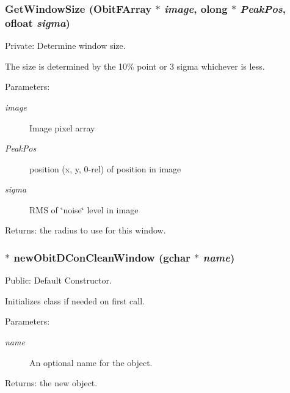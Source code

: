 \subsubsection{ Get\-Window\-Size ({\bf Obit\-FArray} $\ast$ {\em image}, {\bf olong} $\ast$ {\em Peak\-Pos}, {\bf ofloat} {\em sigma})}\label{ObitDConCleanWindow_8c_a6}


Private: Determine window size. 

The size is determined by the 10\% point or 3 sigma whichever is less. \begin{Desc}
\item[Parameters:]
\begin{description}
\item[{\em image}]Image pixel array \item[{\em Peak\-Pos}]position (x, y, 0-rel) of position in image \item[{\em sigma}]RMS of \char`\"{}noise\char`\"{} level in image \end{description}
\end{Desc}
\begin{Desc}
\item[Returns:]the radius to use for this window. \end{Desc}
\subsubsection{$\ast$ new\-Obit\-DCon\-Clean\-Window (gchar $\ast$ {\em name})}\label{ObitDConCleanWindow_8c_a11}


Public: Default Constructor. 

Initializes class if needed on first call. \begin{Desc}
\item[Parameters:]
\begin{description}
\item[{\em name}]An optional name for the object. \end{description}
\end{Desc}
\begin{Desc}
\item[Returns:]the new object. \end{Desc}
